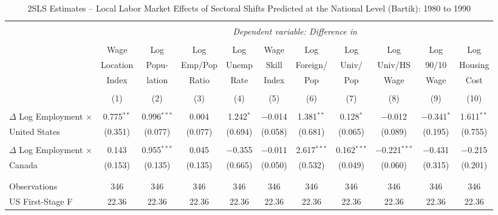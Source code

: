 

\begin{sidewaystable}[!htbp] \centering 
  \caption{2SLS Estimates -- Local Labor Market Effects of Sectoral Shifts Predicted at the National Level (Bartik):  1980 to 1990} 
  \label{tab:bartik_2sls_80s} 
\small
\begin{threeparttable}
\begin{tabular}{@{\extracolsep{5pt}}lcccccccccc} 
\\[-1.8ex]\hline 
\hline \\[-1.8ex] 
 & \multicolumn{10}{c}{\textit{Dependent variable: Difference in }} \\ 
\cline{2-11} 
\\[-2.0ex]
 & Wage & Log & Log & Log & Wage & Log & Log & Log & Log & Log \\
 & Location & Popu- & Emp/Pop & Unemp & Skill & Foreign/ & Univ/ & Univ/HS & 90/10 & Housing \\
 & Index & lation & Ratio & Rate & Index & Pop & Pop & Wage & Wage & Cost \\
\\[-1.8ex] & (1) & (2) & (3) & (4) & (5) & (6) & (7) & (8) & (9) & (10)\\ 
\hline \\[-1.8ex] 
 $\Delta$ Log Employment $\times$ & 0.775$^{**}$ & 0.996$^{***}$ & 0.004 & 1.242$^{*}$ & $-$0.014 & 1.381$^{**}$ & 0.128$^{*}$ & $-$0.012 & $-$0.341$^{*}$ & 1.611$^{**}$ \\ 
United States  & (0.351) & (0.077) & (0.077) & (0.694) & (0.058) & (0.681) & (0.065) & (0.089) & (0.195) & (0.755) \\ 
  & & & & & & & & & & \\ 
 $\Delta$ Log Employment $\times$ & 0.143 & 0.955$^{***}$ & 0.045 & $-$0.355 & $-$0.011 & 2.617$^{***}$ & 0.162$^{***}$ & $-$0.221$^{***}$ & $-$0.431 & $-$0.215 \\ 
Canada  & (0.153) & (0.135) & (0.135) & (0.665) & (0.050) & (0.532) & (0.049) & (0.060) & (0.315) & (0.201) \\ 
  & & & & & & & & & & \\ 
\hline \\[-1.8ex] 
Observations & 346 & 346 & 346 & 346 & 346 & 346 & 346 & 346 & 346 & 346 \\ 
US First-Stage F & 22.36 & 22.36 & 22.36 & 22.36 & 22.36 & 22.36 & 22.36 & 22.36 & 22.36 & 22.36 \\

\end{tabular}
\end{threeparttable}
\end{sidewaystable}
